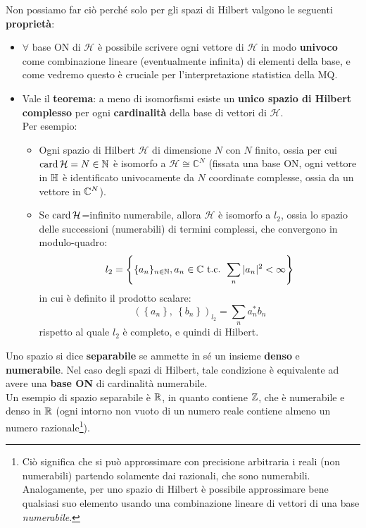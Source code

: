\documentclass[FisicaTeorica.tex]{subfiles}
\begin{document}
Non possiamo far ciò perché solo per gli spazi di Hilbert valgono le seguenti \textbf{proprietà}:
\begin{itemize}
    \item $\forall$ base ON di $\mathcal{H}$ è possibile scrivere ogni vettore di $\mathcal{H}$ in modo \textbf{univoco} come combinazione lineare (eventualmente infinita) di elementi della base, e come vedremo questo è cruciale per l'interpretazione statistica della MQ.
    \item Vale il \textbf{teorema}: a meno di isomorfismi esiste un \textbf{unico spazio di Hilbert} \textbf{complesso} per ogni \textbf{cardinalità} della base di vettori di $\mathcal{H}$.\\
    Per esempio:
    \begin{itemize}
        \item Ogni spazio di Hilbert $\mathcal{H}$ di dimensione $N$ con $N$ finito, ossia per cui $\operatorname{card}\mathcal{H}=N\in \mathbb{N}$ è isomorfo a $\mathcal{H}\cong\mathbb{C}^N$ (fissata una base ON, ogni vettore in $\mathbb{H}$ è identificato univocamente da $N$ coordinate complesse, ossia da un vettore in $\mathbb{C}^N$).
        \item Se $\operatorname{card}\mathcal{H}$=infinito numerabile, allora $\mathcal{H}$ è isomorfo a $l_2$, ossia lo spazio delle successioni (numerabili) di termini complessi, che convergono in modulo-quadro:
        \[
	l_2 = \left \{ \{a_n\}_{n\in\mathbb{N}}, a_n \in \mathbb{C} \text{ t.c. } \sum_n |a_n|^2 < \infty \right \}
	\]
	in cui è definito il prodotto scalare:
	\[
	\left(\left\{a_n\right\},\ \left\{b_n\right\}\right)_{l_2}= \sum_{n}{a_n^* b_n}
	\]
    rispetto al quale $l_2$ è completo, e quindi di Hilbert.  
    \end{itemize}
\end{itemize}
\begin{dfn}
Uno spazio si dice \textbf{separabile}  se ammette in sé un insieme \textbf{denso} e \textbf{numerabile}. Nel caso degli spazi di Hilbert, tale condizione è equivalente ad avere una \textbf{base ON} di cardinalità numerabile.\\
Un esempio di spazio separabile è $\mathbb{R}$, in quanto contiene $\mathbb{Z}$, che è numerabile e denso in $\mathbb{R}$ (ogni intorno non vuoto di un numero reale contiene almeno un numero razionale\footnote{Ciò significa che si può approssimare con precisione arbitraria i reali (non numerabili) partendo solamente dai razionali, che sono numerabili. Analogamente, per uno spazio di Hilbert è possibile approssimare bene qualsiasi suo elemento usando una combinazione lineare di vettori di una base \textit{numerabile}.}).
\end{dfn}
\end{document}
